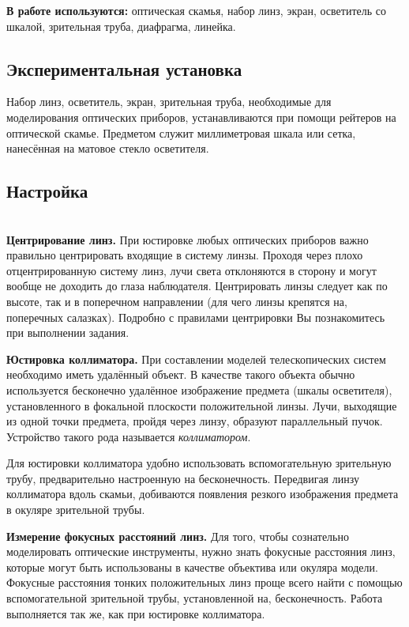 \documentclass[a4paper, 12pt]{article}%
\begin{document}
	\textbf{В работе используются:} оптическая скамья, набор линз, экран, осветитель со шкалой, зрительная труба, диафрагма, линейка.\\
	
	\subsection{Экспериментальная установка}
	 Набор линз, осветитель, экран, зрительная труба, необходимые для моделирования оптических приборов, устанавливаются при помощи рейтеров на оптической скамье. Предметом служит
	миллиметровая шкала или сетка, нанесённая на матовое стекло осветителя.
	
	\subsection{Настройка}
	
	$ $\\
	
	\textbf{Центрирование линз.} При юстировке любых оптических приборов важно правильно центрировать входящие в систему линзы. Проходя через плохо
	отцентрированную систему линз, лучи света отклоняются в сторону и могут
	вообще не доходить до глаза наблюдателя. Центрировать линзы следует как
	по высоте, так и в поперечном направлении (для чего линзы крепятся на, поперечных салазках). Подробно с правилами центрировки Вы познакомитесь
	при выполнении задания.
	
	\textbf{Юстировка коллиматора.} При составлении моделей телескопических
	систем необходимо иметь удалённый объект. В качестве такого объекта обычно используется бесконечно удалённое изображение предмета (шкалы осветителя), установленного в фокальной плоскости положительной линзы. Лучи,
	выходящие из одной точки предмета, пройдя через линзу, образуют параллельный пучок. Устройство такого рода называется \textit{коллиматором}.

	Для юстировки коллиматора удобно использовать вспомогательную зрительную трубу, предварительно настроенную на бесконечность. Передвигая
	линзу коллиматора вдоль скамьи, добиваются появления резкого изображения предмета в окуляре зрительной трубы.
	
	\textbf{Измерение фокусных расстояний линз.} Для того, чтобы сознательно
	моделировать оптические инструменты, нужно знать фокусные расстояния
	линз, которые могут быть использованы в качестве объектива или окуляра модели. Фокусные расстояния тонких положительных линз проще всего
	найти с помощью вспомогательной зрительной трубы, установленной на, бесконечность. Работа выполняется так же, как при юстировке коллиматора.
	
\end{document}
